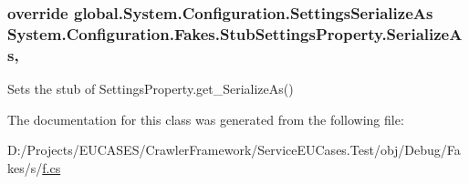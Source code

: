 \hypertarget{class_system_1_1_configuration_1_1_fakes_1_1_stub_settings_property_a0ad233811003228dbbef64e61ed5fa25}{
\subsubsection[{Serialize\-As}]{\setlength{\rightskip}{0pt plus 5cm}override global.\-System.\-Configuration.\-Settings\-Serialize\-As System.\-Configuration.\-Fakes.\-Stub\-Settings\-Property.\-Serialize\-As\hspace{0.3cm}{\ttfamily [get]}, {\ttfamily [set]}}}\label{class_system_1_1_configuration_1_1_fakes_1_1_stub_settings_property_a0ad233811003228dbbef64e61ed5fa25}


Sets the stub of Settings\-Property.\-get\-\_\-\-Serialize\-As()



The documentation for this class was generated from the following file\-:\begin{DoxyCompactItemize}
\item 
D\-:/\-Projects/\-E\-U\-C\-A\-S\-E\-S/\-Crawler\-Framework/\-Service\-E\-U\-Cases.\-Test/obj/\-Debug/\-Fakes/s/\hyperlink{s_2f_8cs}{f.\-cs}\end{DoxyCompactItemize}
